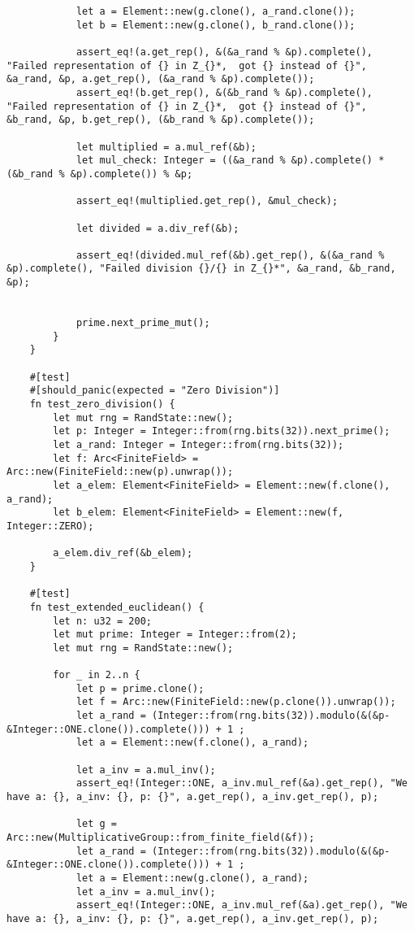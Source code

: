 \begin{verbatim}
            let a = Element::new(g.clone(), a_rand.clone());
            let b = Element::new(g.clone(), b_rand.clone());

            assert_eq!(a.get_rep(), &(&a_rand % &p).complete(), "Failed representation of {} in Z_{}*,  got {} instead of {}", &a_rand, &p, a.get_rep(), (&a_rand % &p).complete());
            assert_eq!(b.get_rep(), &(&b_rand % &p).complete(), "Failed representation of {} in Z_{}*,  got {} instead of {}", &b_rand, &p, b.get_rep(), (&b_rand % &p).complete());

            let multiplied = a.mul_ref(&b);
            let mul_check: Integer = ((&a_rand % &p).complete() * (&b_rand % &p).complete()) % &p;

            assert_eq!(multiplied.get_rep(), &mul_check);

            let divided = a.div_ref(&b);

            assert_eq!(divided.mul_ref(&b).get_rep(), &(&a_rand % &p).complete(), "Failed division {}/{} in Z_{}*", &a_rand, &b_rand, &p);


            prime.next_prime_mut();
        }
    }

    #[test]
    #[should_panic(expected = "Zero Division")]
    fn test_zero_division() {
        let mut rng = RandState::new();
        let p: Integer = Integer::from(rng.bits(32)).next_prime();
        let a_rand: Integer = Integer::from(rng.bits(32));
        let f: Arc<FiniteField> = Arc::new(FiniteField::new(p).unwrap());
        let a_elem: Element<FiniteField> = Element::new(f.clone(), a_rand);
        let b_elem: Element<FiniteField> = Element::new(f, Integer::ZERO);

        a_elem.div_ref(&b_elem);
    }

    #[test]
    fn test_extended_euclidean() {
        let n: u32 = 200;
        let mut prime: Integer = Integer::from(2);
        let mut rng = RandState::new();

        for _ in 2..n {
            let p = prime.clone();
            let f = Arc::new(FiniteField::new(p.clone()).unwrap());
            let a_rand = (Integer::from(rng.bits(32)).modulo(&(&p-&Integer::ONE.clone()).complete())) + 1 ;
            let a = Element::new(f.clone(), a_rand);

            let a_inv = a.mul_inv();
            assert_eq!(Integer::ONE, a_inv.mul_ref(&a).get_rep(), "We have a: {}, a_inv: {}, p: {}", a.get_rep(), a_inv.get_rep(), p);

            let g = Arc::new(MultiplicativeGroup::from_finite_field(&f));
            let a_rand = (Integer::from(rng.bits(32)).modulo(&(&p-&Integer::ONE.clone()).complete())) + 1 ;
            let a = Element::new(g.clone(), a_rand);
            let a_inv = a.mul_inv();
            assert_eq!(Integer::ONE, a_inv.mul_ref(&a).get_rep(), "We have a: {}, a_inv: {}, p: {}", a.get_rep(), a_inv.get_rep(), p);



\end{verbatim}
